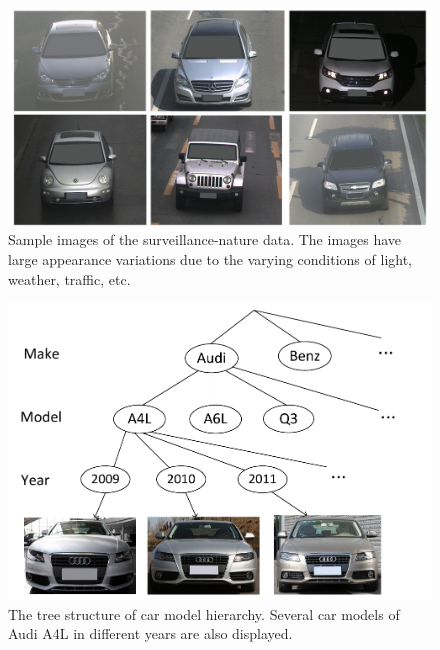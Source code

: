 \documentclass[10pt,twocolumn,letterpaper]{article}
\begin{document}
\begin{figure}[t]\centering
\includegraphics[width=0.9\linewidth]{sv_data.pdf}
\caption{Sample images of the surveillance-nature data. The images have large appearance variations due to the varying conditions of light, weather, traffic, etc.}
\label{fig:sv_data}
\vspace{-4pt}
\end{figure}


\begin{figure}[t]\centering
\includegraphics[width=0.8\linewidth]{tree.pdf}
\caption{The tree structure of car model hierarchy. Several car models of Audi A4L in different years are also displayed. }
\label{fig:tree}
\vspace{-4pt}
\end{figure}
\end{document}
